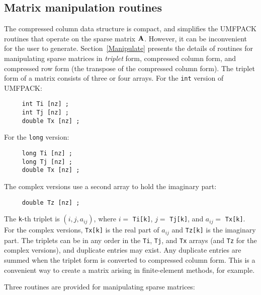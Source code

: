 \subsection{Matrix manipulation routines}

The compressed column data structure is compact, and simplifies the UMFPACK
routines that operate on the sparse matrix ${\bf{A}}$.  However, it can be
inconvenient for the user to generate.  Section~\ref{Manipulate} presents the
details of routines for manipulating sparse matrices in {\em triplet} form,
compressed column form, and compressed row form (the transpose of the
compressed column form).  The triplet form of a matrix consists of three or
four arrays.  For the {\tt int} version of UMFPACK:

{\footnotesize
\begin{verbatim}
     int Ti [nz] ;
     int Tj [nz] ;
     double Tx [nz] ;
\end{verbatim}
}

For the {\tt long} version:

{\footnotesize
\begin{verbatim}
     long Ti [nz] ;
     long Tj [nz] ;
     double Tx [nz] ;
\end{verbatim}
}

The complex versions use a second array to hold the imaginary part:

{\footnotesize
\begin{verbatim}
     double Tz [nz] ;
\end{verbatim}
}

The {\tt k}-th triplet is $(i,j,a_{ij})$, where $i =$ {\tt Ti[k]},
$j =$ {\tt Tj[k]}, and $a_{ij} =$ {\tt Tx[k]}.  For the complex versions,
{\tt Tx[k]} is the real part of $a_{ij}$ and
{\tt Tz[k]} is the imaginary part.
The triplets can be in any
order in the {\tt Ti}, {\tt Tj}, and {\tt Tx} arrays (and {\tt Tz} for
the complex versions), and duplicate entries may
exist.  Any duplicate entries are summed when the triplet form is converted to
compressed column form.  This is a convenient way to create a matrix arising in
finite-element methods, for example.

Three routines are provided for manipulating sparse matrices:

